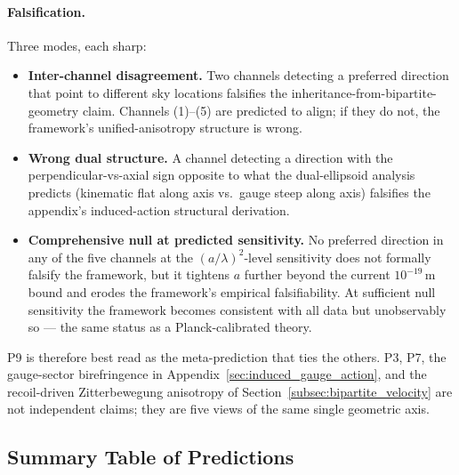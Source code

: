 \paragraph{Falsification.}
Three modes, each sharp:
\begin{itemize}
    \item \textbf{Inter-channel disagreement.} Two channels detecting
        a preferred direction that point to different sky locations
        falsifies the inheritance-from-bipartite-geometry claim.
        Channels (1)--(5) are predicted to align; if they do not,
        the framework's unified-anisotropy structure is wrong.
    \item \textbf{Wrong dual structure.} A channel detecting a
        direction with the perpendicular-vs-axial sign opposite to
        what the dual-ellipsoid analysis predicts (kinematic flat
        along axis vs.\ gauge steep along axis) falsifies the
        appendix's induced-action structural derivation.
    \item \textbf{Comprehensive null at predicted sensitivity.} No
        preferred direction in any of the five channels at the
        $(a/\lambda)^2$-level sensitivity does not formally falsify
        the framework, but it tightens $a$ further beyond the current
        $10^{-19}\,\text{m}$ bound and erodes the framework's
        empirical falsifiability.  At sufficient null sensitivity the
        framework becomes consistent with all data but unobservably so
        --- the same status as a Planck-calibrated theory.
\end{itemize}

P9 is therefore best read as the meta-prediction that ties the
others.  P3, P7, the gauge-sector birefringence in
Appendix~\ref{sec:induced_gauge_action}, and the recoil-driven
Zitterbewegung anisotropy of Section~\ref{subsec:bipartite_velocity}
are not independent claims; they are five views of the same single
geometric axis.

\subsection{Summary Table of Predictions}
\label{subsec:predictions_summary}

